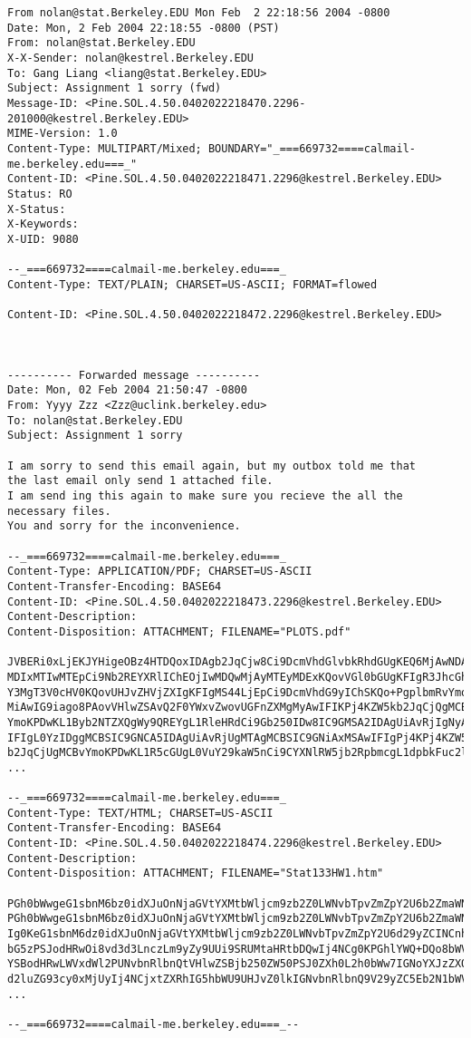 \documentclass[12pt]{article}
\begin{document}
\begin{verbatim}
From nolan@stat.Berkeley.EDU Mon Feb  2 22:18:56 2004 -0800
Date: Mon, 2 Feb 2004 22:18:55 -0800 (PST)
From: nolan@stat.Berkeley.EDU
X-X-Sender: nolan@kestrel.Berkeley.EDU
To: Gang Liang <liang@stat.Berkeley.EDU>
Subject: Assignment 1 sorry (fwd)
Message-ID: <Pine.SOL.4.50.0402022218470.2296-201000@kestrel.Berkeley.EDU>
MIME-Version: 1.0
Content-Type: MULTIPART/Mixed; BOUNDARY="_===669732====calmail-me.berkeley.edu===_"
Content-ID: <Pine.SOL.4.50.0402022218471.2296@kestrel.Berkeley.EDU>
Status: RO
X-Status:
X-Keywords:
X-UID: 9080
 
--_===669732====calmail-me.berkeley.edu===_
Content-Type: TEXT/PLAIN; CHARSET=US-ASCII; FORMAT=flowed
 
Content-ID: <Pine.SOL.4.50.0402022218472.2296@kestrel.Berkeley.EDU>
 
 
   
---------- Forwarded message ----------
Date: Mon, 02 Feb 2004 21:50:47 -0800
From: Yyyy Zzz <Zzz@uclink.berkeley.edu>
To: nolan@stat.Berkeley.EDU
Subject: Assignment 1 sorry
 
I am sorry to send this email again, but my outbox told me that 
the last email only send 1 attached file. 
I am send ing this again to make sure you recieve the all the necessary files.
You and sorry for the inconvenience.
  
--_===669732====calmail-me.berkeley.edu===_
Content-Type: APPLICATION/PDF; CHARSET=US-ASCII
Content-Transfer-Encoding: BASE64
Content-ID: <Pine.SOL.4.50.0402022218473.2296@kestrel.Berkeley.EDU>
Content-Description:
Content-Disposition: ATTACHMENT; FILENAME="PLOTS.pdf"
 
JVBERi0xLjEKJYHigeOBz4HTDQoxIDAgb2JqCjw8Ci9DcmVhdGlvbkRhdGUgKEQ6MjAwNDAy
MDIxMTIwMTEpCi9Nb2REYXRlIChEOjIwMDQwMjAyMTEyMDExKQovVGl0bGUgKFIgR3JhcGhp
Y3MgT3V0cHV0KQovUHJvZHVjZXIgKFIgMS44LjEpCi9DcmVhdG9yIChSKQo+PgplbmRvYmoK
MiAwIG9iago8PAovVHlwZSAvQ2F0YWxvZwovUGFnZXMgMyAwIFIKPj4KZW5kb2JqCjQgMCBv
YmoKPDwKL1Byb2NTZXQgWy9QREYgL1RleHRdCi9Gb250IDw8IC9GMSA2IDAgUiAvRjIgNyAw
IFIgL0YzIDggMCBSIC9GNCA5IDAgUiAvRjUgMTAgMCBSIC9GNiAxMSAwIFIgPj4KPj4KZW5k
b2JqCjUgMCBvYmoKPDwKL1R5cGUgL0VuY29kaW5nCi9CYXNlRW5jb2RpbmcgL1dpbkFuc2lF
...
 
--_===669732====calmail-me.berkeley.edu===_
Content-Type: TEXT/HTML; CHARSET=US-ASCII
Content-Transfer-Encoding: BASE64
Content-ID: <Pine.SOL.4.50.0402022218474.2296@kestrel.Berkeley.EDU>
Content-Description:
Content-Disposition: ATTACHMENT; FILENAME="Stat133HW1.htm"
  
PGh0bWwgeG1sbnM6bz0idXJuOnNjaGVtYXMtbWljcm9zb2Z0LWNvbTpvZmZpY2U6b2ZmaWNl^M
PGh0bWwgeG1sbnM6bz0idXJuOnNjaGVtYXMtbWljcm9zb2Z0LWNvbTpvZmZpY2U6b2ZmaWNl^M
Ig0KeG1sbnM6dz0idXJuOnNjaGVtYXMtbWljcm9zb2Z0LWNvbTpvZmZpY2U6d29yZCINCnht^M
bG5zPSJodHRwOi8vd3d3LnczLm9yZy9UUi9SRUMtaHRtbDQwIj4NCg0KPGhlYWQ+DQo8bWV0^M
YSBodHRwLWVxdWl2PUNvbnRlbnQtVHlwZSBjb250ZW50PSJ0ZXh0L2h0bWw7IGNoYXJzZXQ9^M
d2luZG93cy0xMjUyIj4NCjxtZXRhIG5hbWU9UHJvZ0lkIGNvbnRlbnQ9V29yZC5Eb2N1bWVu^M
...

--_===669732====calmail-me.berkeley.edu===_--
    
\end{verbatim}
\end{document}
